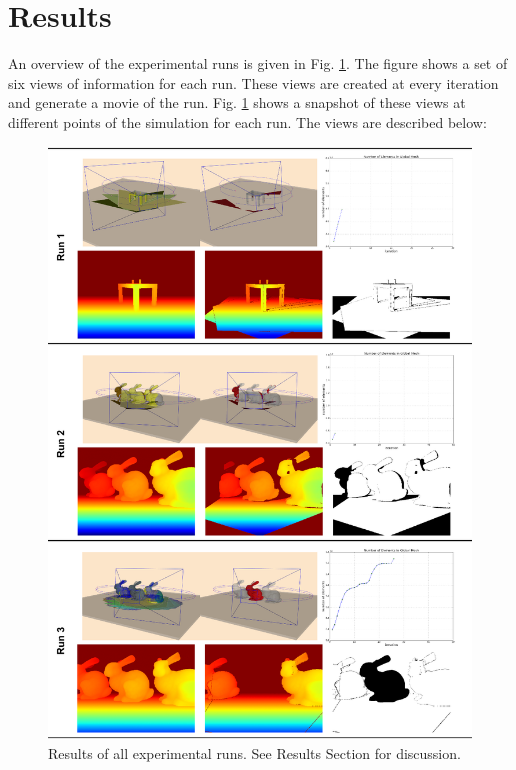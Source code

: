 \section{Results} \label{sec:results}

An overview of the experimental runs is given in Fig. \ref{fig:run123}. The figure shows a set of six views of information for each run. These views are created at every iteration and generate a movie of the run. Fig. \ref{fig:run123} shows a snapshot of these views at different points of the simulation for each run. The views are described below:

\begin{figure}[h]%
\centering
  \includegraphics[width=\textwidth]{figures/run123.png}
  \caption{Results of all experimental runs. See Results Section for discussion.}
  \label{fig:run123}
\end{figure}

